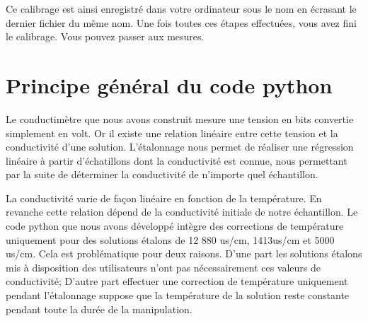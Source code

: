 \documentclass[letterpaper,10pt,french]{sphinxmanual}
\begin{document}
\sphinxAtStartPar
Ce calibrage est ainsi enregistré dans votre ordinateur sous le nom 
en écrasant le dernier fichier du même nom.
Une fois toutes ces étapes effectuées, vous avez fini le calibrage. Vous pouvez passer aux mesures.


\section{Principe général du code python}
\label{\detokenize{Etalonnage:principe-general-du-code-python}}
\sphinxAtStartPar
Le conductimètre que nous avons construit mesure une tension en bits convertie simplement en volt. Or il existe une relation linéaire entre cette tension et la conductivité d’une solution. L’étalonnage nous permet de réaliser une régression linéaire  à partir d’échatillons dont la conductivité est connue, nous permettant par la suite de déterminer la conductivité de n’importe quel échantillon.

\sphinxAtStartPar
La conductivité varie de façon linéaire en fonction de la température. En revanche cette relation dépend de la conductivité initiale de notre échantillon. Le code python que nous avons développé intègre des corrections de température uniquement pour des solutions étalons de 12 880 us/cm, 1413us/cm et 5000 us/cm. Cela est problématique pour deux raisons. D’une part les solutions étalons mis à disposition des utilisateurs n’ont pas nécessairement ces valeurs de conductivité; D’autre part effectuer une correction de température uniquement pendant l’étalonnage suppose que la température  de la solution reste constante pendant toute la durée de la manipulation.

\begin{figure}[htbp]
\centering

\noindent{}
\end{figure}

\begin{figure}[htbp]
\centering

\noindent{}
\end{figure}

\begin{figure}[htbp]
\centering

\noindent{}
\end{figure}
\end{document}
